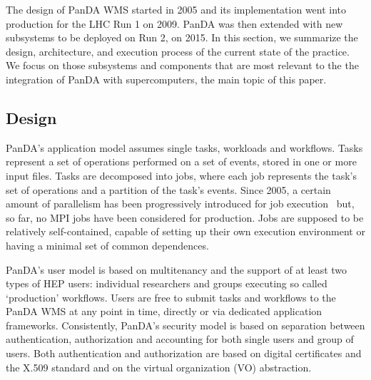 The design of PanDA WMS started in 2005 and its implementation went into
production for the LHC Run 1 on 2009. PanDA was then extended with new
subsystems to be deployed on Run 2, on 2015. In this section, we summarize the
design, architecture, and execution process of the current state of the
practice. We focus on those subsystems and components that are most relevant to
the the integration of PanDA with supercomputers, the main topic of this paper.


\subsection{Design}
\label{ssec:panda_design}


PanDA's application model assumes single tasks, workloads and workflows. Tasks
represent a set of operations performed on a set of events, stored in one or
more input files. Tasks are decomposed into jobs, where each job represents the
task's set of operations and a partition of the task's events. Since 2005, a
certain amount of parallelism has been progressively introduced for job
execution~\cite{crooks2012multi} but, so far, no MPI jobs have been considered
for production. Jobs are supposed to be relatively self-contained, capable of
setting up their own execution environment or having a minimal set of common
dependences.


PanDA's user  model is based on multitenancy 
and the support of at least two types of HEP users: individual researchers and
groups executing so called `production' workflows. Users are free to submit
tasks and workflows to the PanDA WMS at any point in time, directly or via
dedicated application frameworks. Consistently, PanDA's security model is
based on separation between authentication, authorization and accounting for
both single users and group of users. Both authentication and authorization
are based on digital certificates and the X.509 standard and on the virtual
organization (VO) abstraction.

